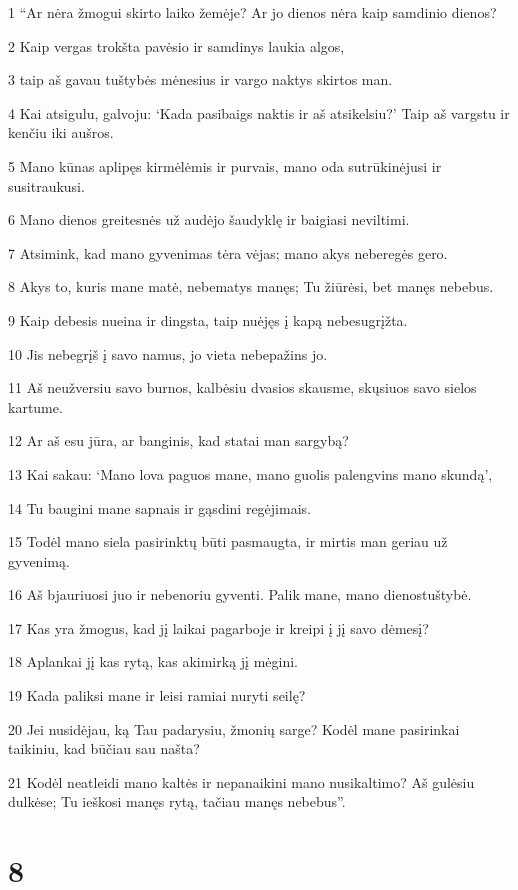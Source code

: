\par 1 “Ar nėra žmogui skirto laiko žemėje? Ar jo dienos nėra kaip samdinio dienos? 
\par 2 Kaip vergas trokšta pavėsio ir samdinys laukia algos, 
\par 3 taip aš gavau tuštybės mėnesius ir vargo naktys skirtos man. 
\par 4 Kai atsigulu, galvoju: ‘Kada pasibaigs naktis ir aš atsikelsiu?’ Taip aš vargstu ir kenčiu iki aušros. 
\par 5 Mano kūnas aplipęs kirmėlėmis ir purvais, mano oda sutrūkinėjusi ir susitraukusi. 
\par 6 Mano dienos greitesnės už audėjo šaudyklę ir baigiasi neviltimi. 
\par 7 Atsimink, kad mano gyvenimas tėra vėjas; mano akys neberegės gero. 
\par 8 Akys to, kuris mane matė, nebematys manęs; Tu žiūrėsi, bet manęs nebebus. 
\par 9 Kaip debesis nueina ir dingsta, taip nuėjęs į kapą nebesugrįžta. 
\par 10 Jis nebegrįš į savo namus, jo vieta nebepažins jo. 
\par 11 Aš neužversiu savo burnos, kalbėsiu dvasios skausme, skųsiuos savo sielos kartume. 
\par 12 Ar aš esu jūra, ar banginis, kad statai man sargybą? 
\par 13 Kai sakau: ‘Mano lova paguos mane, mano guolis palengvins mano skundą’, 
\par 14 Tu baugini mane sapnais ir gąsdini regėjimais. 
\par 15 Todėl mano siela pasirinktų būti pasmaugta, ir mirtis man geriau už gyvenimą. 
\par 16 Aš bjauriuosi juo ir nebenoriu gyventi. Palik mane, mano dienos­tuštybė. 
\par 17 Kas yra žmogus, kad jį laikai pagarboje ir kreipi į jį savo dėmesį? 
\par 18 Aplankai jį kas rytą, kas akimirką jį mėgini. 
\par 19 Kada paliksi mane ir leisi ramiai nuryti seilę? 
\par 20 Jei nusidėjau, ką Tau padarysiu, žmonių sarge? Kodėl mane pasirinkai taikiniu, kad būčiau sau našta? 
\par 21 Kodėl neatleidi mano kaltės ir nepanaikini mano nusikaltimo? Aš gulėsiu dulkėse; Tu ieškosi manęs rytą, tačiau manęs nebebus”.



\chapter{8}


